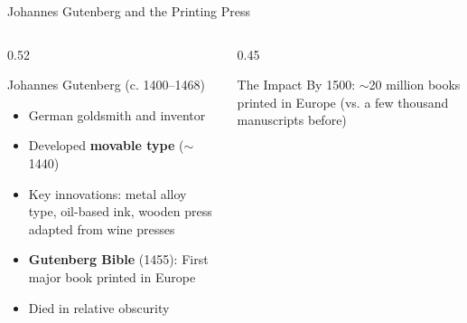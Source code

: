 \documentclass[aspectratio=169,11pt]{beamer}
\begin{document}
\begin{frame}{Johannes Gutenberg and the Printing Press}
\begin{columns}
\begin{column}{0.52\textwidth}
\begin{block}{Johannes Gutenberg (c. 1400--1468)}
\begin{itemize}
  \item German goldsmith and inventor
  \item Developed \textbf{movable type} ($\sim$1440)
  \item Key innovations: metal alloy type, oil-based ink, wooden press adapted from wine presses
  \item \textbf{Gutenberg Bible} (1455): First major book printed in Europe
  \item Died in relative obscurity
\end{itemize}
\end{block}
\end{column}

\begin{column}{0.45\textwidth}

\vspace{0.3em}
\begin{exampleblock}{The Impact}
By 1500: $\sim$20 million books printed in Europe (vs. a few thousand manuscripts before)
\end{exampleblock}
\end{column}
\end{columns}
\end{frame}
\end{document}
